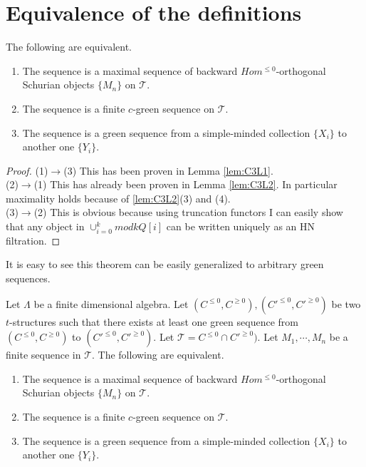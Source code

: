 \section{Equivalence of the definitions}
\begin{theorem}
\indent The following are equivalent.
\begin{enumerate}
\item The sequence is a maximal sequence of backward $Hom^{\leq 0}$-orthogonal Schurian objects $\{M_n\}$ on $\mathcal{T}$.
\item The sequence is a finite $c$-green sequence on $\mathcal{T}$.
\item The sequence is a green sequence from a simple-minded collection $\{X_i\}$ to another one $\{Y_i\}$.
\end{enumerate}
\end{theorem}
\begin{proof}
(1)$\to$(3) This has been proven in Lemma \ref{lem:C3L1}.\\
(2)$\to$(1) This has already been proven in Lemma \ref{lem:C3L2}. In particular maximality holds because of \ref{lem:C3L2}(3) and (4).\\
(3)$\to$(2) This is obvious because using truncation functors I can easily show that any object in $\cup_{i=0}^k mod kQ[i]$ can be written uniquely as an HN filtration. 
\end{proof}
\indent It is easy to see this theorem can be easily generalized to arbitrary green sequences.
\begin{theorem}
\indent Let $\Lambda$ be a finite dimensional algebra. Let $(C^{\leq 0}, C^{\geq 0}), (C'^{\leq 0}, C'^{\geq 0})$ be two $t$-structures such that there exists at least one green sequence from $(C^{\leq 0}, C^{\geq 0})$ to $(C'^{\leq 0}, C'^{\geq 0})$. Let $\mathcal{T} = C^{\leq 0}\cap C'^{\geq 0})$.  Let $M_1,\cdots, M_n$ be a finite sequence in $\mathcal{T}$. The following are equivalent.
\begin{enumerate}
\item The sequence is a maximal sequence of backward $Hom^{\leq 0}$-orthogonal Schurian objects $\{M_n\}$ on $\mathcal{T}$.
\item The sequence is a finite $c$-green sequence on $\mathcal{T}$.
\item The sequence is a green sequence from a simple-minded collection $\{X_i\}$ to another one $\{Y_i\}$.
\end{enumerate}
\end{theorem}